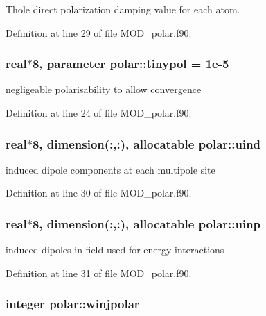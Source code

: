 Thole direct polarization damping value for each atom. 



Definition at line 29 of file M\-O\-D\-\_\-polar.\-f90.

\hypertarget{classpolar_ac76c3b5b686c0cdb26312751ef275b31}{
\subsubsection[{tinypol}]{\setlength{\rightskip}{0pt plus 5cm}real$\ast$8, parameter polar\-::tinypol = 1e-\/5}}\label{classpolar_ac76c3b5b686c0cdb26312751ef275b31}


negligeable polarisability to allow convergence 



Definition at line 24 of file M\-O\-D\-\_\-polar.\-f90.

\hypertarget{classpolar_a14c2aa74b13c1c6313c7efb2400c2959}{
\subsubsection[{uind}]{\setlength{\rightskip}{0pt plus 5cm}real$\ast$8, dimension(\-:,\-:), allocatable polar\-::uind}}\label{classpolar_a14c2aa74b13c1c6313c7efb2400c2959}


induced dipole components at each multipole site 



Definition at line 30 of file M\-O\-D\-\_\-polar.\-f90.

\hypertarget{classpolar_ab5ed650307b23a70ff6800e88ea64395}{
\subsubsection[{uinp}]{\setlength{\rightskip}{0pt plus 5cm}real$\ast$8, dimension(\-:,\-:), allocatable polar\-::uinp}}\label{classpolar_ab5ed650307b23a70ff6800e88ea64395}


induced dipoles in field used for energy interactions 



Definition at line 31 of file M\-O\-D\-\_\-polar.\-f90.

\hypertarget{classpolar_aa5a482c70037e55aa86b48cfd025a2b4}{
\subsubsection[{winjpolar}]{\setlength{\rightskip}{0pt plus 5cm}integer polar\-::winjpolar}}\label{classpolar_aa5a482c70037e55aa86b48cfd025a2b4}


